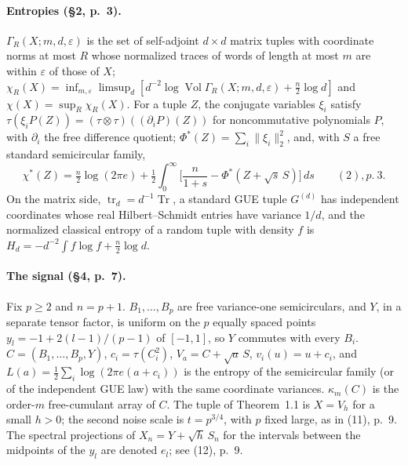 \documentclass[11pt]{article}
\DeclareMathOperator{\Tr}{Tr}
\newcommand{\norm}[1]{\lVert #1\rVert}
\newcommand{\ploc}[2]{#1}
\begin{document}
\paragraph{Entropies \ploc{(\S2, p.~3)}{02-conventions.tex:12--90}.}
$\Gamma_R(X;m,d,\varepsilon)$ is the set of self-adjoint $d\times d$ matrix
tuples with coordinate norms at most $R$ whose normalized traces of words of
length at most $m$ are within $\varepsilon$ of those of $X$;
$\chi_R(X)=\inf_{m,\varepsilon}\limsup_{d}[d^{-2}\log\operatorname{Vol}\Gamma_R(X;m,d,\varepsilon)+\frac n2\log d]$
and $\chi(X)=\sup_R\chi_R(X)$. For a tuple $Z$, the conjugate variables $\xi_i$
satisfy $\tau(\xi_iP(Z))=(\tau\otimes\tau)((\partial_iP)(Z))$ for
noncommutative polynomials $P$, with $\partial_i$ the free difference quotient;
$\Phi^*(Z)=\sum_i\norm{\xi_i}_2^2$, and, with $S$ a free standard semicircular
family,
\[
 \chi^*(Z)=\tfrac n2\log(2\pi e)+\tfrac12\int_0^\infty\Big[\frac n{1+s}-\Phi^*(Z+\sqrt s\,S)\Big]\,ds
 \qquad\ploc{(2), p.~3}{02-conventions.tex:73--78}.
\]
On the matrix side, $\operatorname{tr}_d=d^{-1}\Tr$, a standard GUE tuple
$G^{(d)}$ has independent coordinates whose real Hilbert--Schmidt entries have
variance $1/d$, and the normalized classical entropy of a random tuple with
density $f$ is $H_d=-d^{-2}\int f\log f+\frac n2\log d$.

\paragraph{The signal \ploc{(\S4, p.~7)}{04-signal.tex:8--21}.}
Fix $p\ge2$ and $n=p+1$. $B_1,\dots,B_p$ are free variance-one semicirculars,
and $Y$, in a separate tensor factor, is uniform on the $p$ equally spaced
points $y_l=-1+2(l-1)/(p-1)$ of $[-1,1]$, so $Y$ commutes with every $B_i$.
$C=(B_1,\dots,B_p,Y)$, $c_i=\tau(C_i^2)$, $V_a=C+\sqrt a\,S$,
$v_i(u)=u+c_i$, and $L(a)=\frac12\sum_i\log(2\pi e(a+c_i))$ is the entropy of
the semicircular family (or of the independent GUE law) with the same
coordinate variances. $\kappa_m(C)$ is the order-$m$ free-cumulant array of
$C$. The tuple of Theorem~1.1 is $X=V_h$ for a small $h>0$; the second noise
scale is $t=p^{3/4}$, with $p$ fixed large, as in
\ploc{(11), p.~9}{04-signal.tex:110--125}. The spectral projections of
$X_n=Y+\sqrt h\,S_n$ for the intervals between the midpoints of the $y_l$ are
denoted $e_l$; see \ploc{(12), p.~9}{04-signal.tex:127--147}.
\end{document}
